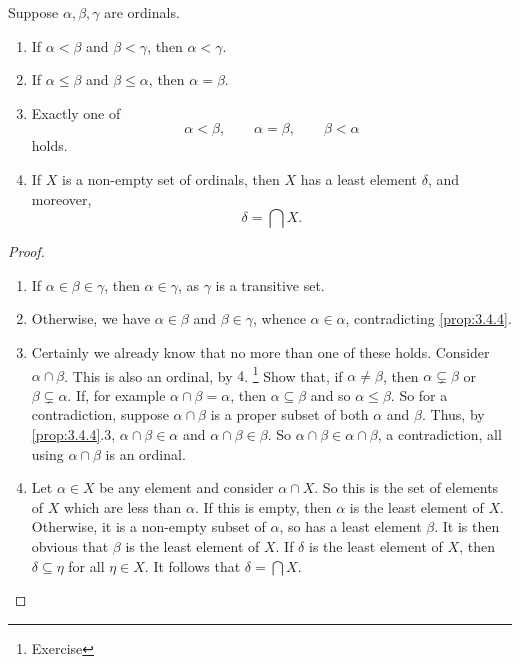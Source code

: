 \begin{theorem}
\label{thm:3.4.6}
Suppose $ \alpha, \beta, \gamma $ are ordinals.
\begin{enumerate}
\item If $ \alpha < \beta $ and $ \beta < \gamma $, then $ \alpha < \gamma $.
\item If $ \alpha \le \beta $ and $ \beta \le \alpha $, then $ \alpha = \beta $.
\item Exactly one of
$$ \alpha < \beta, \qquad \alpha = \beta, \qquad \beta < \alpha $$
holds.
\item If $ X $ is a non-empty set of ordinals, then $ X $ has a least element $ \delta $, and moreover,
$$ \delta = \bigcap X. $$
\end{enumerate}
\end{theorem}

\begin{proof}
\hfill
\begin{enumerate}
\item If $ \alpha \in \beta \in \gamma $, then $ \alpha \in \gamma $, as $ \gamma $ is a transitive set.
\item Otherwise, we have $ \alpha \in \beta $ and $ \beta \in \gamma $, whence $ \alpha \in \alpha $, contradicting \ref{prop:3.4.4}.
\item Certainly we already know that no more than one of these holds. Consider $ \alpha \cap \beta $. This is also an ordinal, by $ 4 $. \footnote{Exercise} Show that, if $ \alpha \ne \beta $, then $ \alpha \subsetneq \beta $ or $ \beta \subsetneq \alpha $. If, for example $ \alpha \cap \beta = \alpha $, then $ \alpha \subseteq \beta $ and so $ \alpha \le \beta $. So for a contradiction, suppose $ \alpha \cap \beta $ is a proper subset of both $ \alpha $ and $ \beta $. Thus, by \ref{prop:3.4.4}.$ 3 $, $ \alpha \cap \beta \in \alpha $ and $ \alpha \cap \beta \in \beta $. So $ \alpha \cap \beta \in \alpha \cap \beta $, a contradiction, all using $ \alpha \cap \beta $ is an ordinal.
\item Let $ \alpha \in X $ be any element and consider $ \alpha \cap X $. So this is the set of elements of $ X $ which are less than $ \alpha $. If this is empty, then $ \alpha $ is the least element of $ X $. Otherwise, it is a non-empty subset of $ \alpha $, so has a least element $ \beta $. It is then obvious that $ \beta $ is the least element of $ X $. If $ \delta $ is the least element of $ X $, then $ \delta \subseteq \eta $ for all $ \eta \in X $. It follows that $ \delta = \bigcap X $.
\end{enumerate}
\end{proof}

